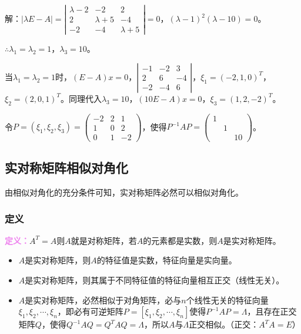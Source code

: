 \documentclass[UTF8, 12pt]{ctexart}
\begin{document}
解：$\vert\lambda E-A\vert=\left|\begin{array}{ccc}
    \lambda-2 & -2 & 2 \\
    2 & \lambda+5 & -4 \\
    -2 & -4 & \lambda+5
\end{array}\right|=0$，$(\lambda-1)^2(\lambda-10)=0$。

$\therefore\lambda_1=\lambda_2=1$，$\lambda_3=10$。

当$\lambda_1=\lambda_2=1$时，$(E-A)x=0$，$\left|\begin{array}{ccc}
    -1 & -2 & 3 \\
    2 & 6 & -4 \\
    -2 & -4 & 6
\end{array}\right|$，$\xi_1=(-2,1,0)^T$，$\xi_2=(2,0,1)^T$。同理代入$\lambda_3=10$，$(10E-A)x=0$，$\xi_3=(1,2,-2)^T$。

令$P=(\xi_1,\xi_2,\xi_3)=\left(\begin{array}{ccc}
    -2 & 2 & 1 \\
    1 & 0 & 2 \\
    0 & 1 & -2
\end{array}\right)$，使得$P^{-1}AP=\left(\begin{array}{ccc}
    1 \\
     & 1 \\
     & & 10
\end{array}\right)$。

\subsection{实对称矩阵相似对角化}

由相似对角化的充分条件可知，实对称矩阵必然可以相似对角化。

\subsubsection{定义}

\textcolor{violet}{\textbf{定义：}}$A^T=A$则$A$就是对称矩阵，若$A$的元素都是实数，则$A$是实对称矩阵。

\begin{itemize}
    \item $A$是实对称矩阵，则$A$的特征值是实数，特征向量是实向量。
    \item $A$是实对称矩阵，则其属于不同特征值的特征向量相互正交（线性无关）。
    \item $A$是实对称矩阵，必然相似于对角矩阵，必与$n$个线性无关的特征向量$\xi_1,\xi_2,\cdots,\xi_n$，即必有可逆矩阵$P=[\xi_1,\xi_2,\cdots,\xi_n]$使得$P^{-1}AP=\Lambda$，且存在正交矩阵$Q$，使得$Q^{-1}AQ=Q^TAQ=\Lambda$，所以$A$与$\Lambda$正交相似。（正交：$A^TA=E$）
\end{itemize}
\end{document}
